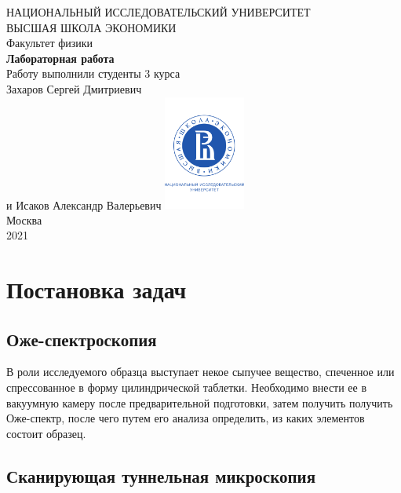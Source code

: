 \documentclass[a4paper, 12pt]{article}
\begin{document}
\begin{titlepage}
	\begin{center}
		$$$$
		$$$$
		$$$$
		$$$$
		{\Large{НАЦИОНАЛЬНЫЙ ИССЛЕДОВАТЕЛЬСКИЙ УНИВЕРСИТЕТ}}\\
		\vspace{0.1cm}
		{\Large{ВЫСШАЯ ШКОЛА ЭКОНОМИКИ}}\\
		\vspace{0.25cm}
		{\large{Факультет физики}}\\
		\vspace{5.5cm}
		{\Huge\textbf{{Лабораторная работа}}}\\%
		\vspace{1cm}
		{Работу выполнили студенты 3 курса}\\
		{Захаров Сергей Дмитриевич}\\
		{и Исаков Александр Валерьевич}
		\vfill
		\includegraphics[width = 0.2\textwidth]{HSElogo}\\
		\vfill
		Москва\\
		2021
	\end{center}
\end{titlepage}

\tableofcontents

\newpage

\section{Постановка задач}



\subsection{Оже-спектроскопия}

В роли исследуемого образца выступает некое сыпучее вещество, спеченное или спрессованное в форму цилиндрической таблетки. Необходимо внести ее в вакуумную камеру после предварительной подготовки, затем получить получить Оже-спектр, после чего путем его анализа определить, из каких элементов состоит образец.

\subsection{Сканирующая туннельная микроскопия}
\end{document}
